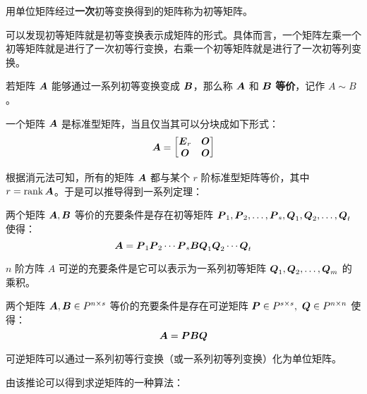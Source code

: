 \begin{definition}[初等矩阵]
	用单位矩阵经过\textbf{一次}初等变换得到的矩阵称为初等矩阵。
\end{definition}

可以发现初等矩阵就是初等变换表示成矩阵的形式。具体而言，一个矩阵左乘一个初等矩阵就是进行了一次初等行变换，右乘一个初等矩阵就是进行了一次初等列变换。

\begin{definition}[矩阵的等价]
	若矩阵 $\boldsymbol{A}$ 能够通过一系列初等变换变成 $\boldsymbol{B}$，那么称 $\boldsymbol{A}$ 和 $\boldsymbol{B}$ \textbf{等价}，记作 $A \sim B$。 
\end{definition}

\begin{definition}[标准型矩阵]
	一个矩阵 $\boldsymbol{A}$ 是标准型矩阵，当且仅当其可以分块成如下形式：
	$$
	\boldsymbol{A} = \begin{bmatrix}
		\boldsymbol{E}_r & \boldsymbol{O} \\
		\boldsymbol{O} & \boldsymbol{O}
	\end{bmatrix}
	$$
\end{definition}

根据消元法可知，所有的矩阵 $\boldsymbol{A}$ 都与某个 $r$ 阶标准型矩阵等价，其中 $r = \operatorname{rank} \boldsymbol{A}$。于是可以推导得到一系列定理：

\begin{theorem}
	两个矩阵 $\boldsymbol{A}, \boldsymbol{B}$ 等价的充要条件是存在初等矩阵 $\boldsymbol{P}_1, \boldsymbol{P}_2, \dots, \boldsymbol{P}_s, \boldsymbol{Q}_1, \boldsymbol{Q}_2, \dots, \boldsymbol{Q}_t$ 使得：
	$$
	\boldsymbol{A} = \boldsymbol{P}_1 \boldsymbol{P}_2 \cdots \boldsymbol{P}_s \boldsymbol{B} \boldsymbol{Q}_1 \boldsymbol{Q}_2 \cdots \boldsymbol{Q}_t
	$$
\end{theorem}

\begin{theorem}
	$n$ 阶方阵 $A$ 可逆的充要条件是它可以表示为一系列初等矩阵 $\boldsymbol{Q}_1, \boldsymbol{Q}_2, \dots, \boldsymbol{Q}_m$ 的乘积。
\end{theorem}

\begin{corollary}
	两个矩阵 $\boldsymbol{A}, \boldsymbol{B} \in P^{n \times s}$ 等价的充要条件是存在可逆矩阵 $\boldsymbol{P} \in P^{s \times s},\ \boldsymbol{Q} \in P^{n \times n}$ 使得：
	$$
	\boldsymbol{A} = \boldsymbol{P} \boldsymbol{B} \boldsymbol{Q}
	$$
\end{corollary}

\begin{corollary}
	可逆矩阵可以通过一系列初等行变换（或一系列初等列变换）化为单位矩阵。
\end{corollary}

由该推论可以得到求逆矩阵的一种算法：

